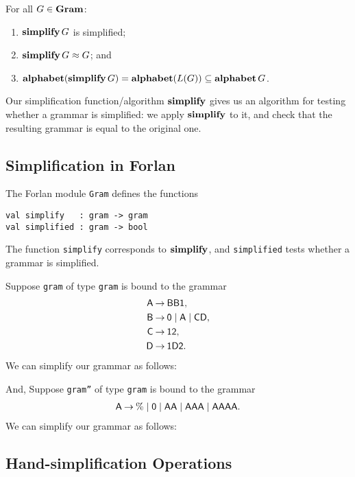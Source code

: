 \begin{theorem}
For all $G\in\mathbf{Gram}$:
\begin{enumerate}[\quad(1)]
\item $\mathbf{simplify}\,G$ is simplified;

\item $\mathbf{simplify}\,G\approx G$; and

\item $\mathbf{alphabet}(\mathbf{simplify}\,G) = \mathbf{alphabet}(L(G)) \subseteq\mathbf{alphabet}\,G$.
\end{enumerate}
\end{theorem}

Our simplification function/algorithm $\mathbf{simplify}$ gives us an
algorithm for testing whether a grammar is simplified: we apply
$\mathbf{simplify}$ to it, and check that the resulting grammar is equal to
the original one.

\subsection{Simplification in Forlan}

The Forlan module \texttt{Gram} defines the functions
\begin{verbatim}
val simplify   : gram -> gram
val simplified : gram -> bool
\end{verbatim}
The function \texttt{simplify} corresponds to $\mathbf{simplify}$, and
\texttt{simplified} tests whether a grammar is simplified.

Suppose \texttt{gram} of type \texttt{gram} is bound to the grammar
\begin{align*}
\mathsf{A} &\mathbin{\to} \mathsf{BB1}, \\
\mathsf{B} &\mathbin{\to} \mathsf{0}\mid\mathsf{A}\mid\mathsf{C}\mathsf{D}, \\
\mathsf{C} &\mathbin{\to} \mathsf{1}\mathsf{2} , \\
\mathsf{D} &\mathbin{\to} \mathsf{1}\mathsf{D}\mathsf{2} .
\end{align*}
We can simplify our grammar as follows:

And, Suppose \texttt{gram''} of type \texttt{gram} is bound to the grammar
\begin{align*}
\mathsf{A} \mathbin{\to} \% \mid \mathsf{0} \mid \mathsf{AA} \mid \mathsf{AAA} \mid
\mathsf{AAAA} .
\end{align*}
We can simplify our grammar as follows:


\subsection{Hand-simplification Operations}

